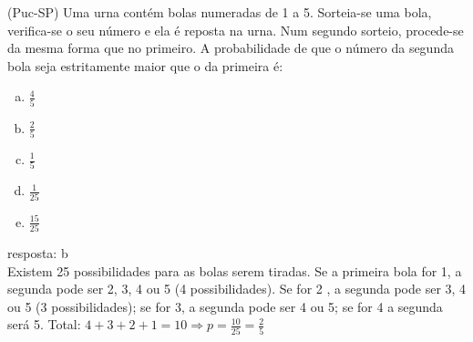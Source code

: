 \begin{ex}
(Puc-SP) Uma urna contém bolas numeradas de 1 a 5. Sorteia-se uma bola, verifica-se o seu número e ela é reposta na urna. Num segundo sorteio, procede-se da mesma forma que no primeiro. A probabilidade de que o número da segunda bola seja estritamente maior que o da primeira é:
    \begin{enumerate}[(a)]
    \item $\frac{4}{5}$
    \item $\frac{2}{5}$
    \item $\frac{1}{5}$
    \item $\frac{1}{25}$
    \item $\frac{15}{25}$
    \end{enumerate}
      \begin{sol}
      resposta: b \\  
      Existem 25 possibilidades para as bolas serem tiradas. Se a primeira bola for 1, a segunda pode ser 2, 3, 4 ou 5 (4 possibilidades). Se for 2 , a segunda pode ser 3, 4 ou 5 (3 possibilidades); se for 3, a segunda pode ser 4 ou 5; se for 4 a segunda será 5. Total: $4+3+2+1=10 \Longrightarrow p=\frac{10}{25}=\frac{2}{5}$
      \end{sol}
\end{ex}
